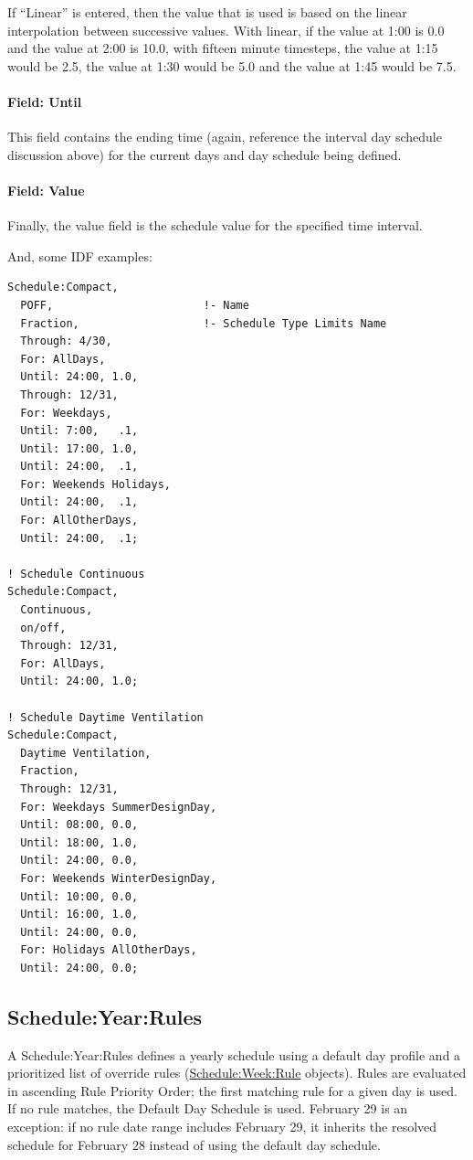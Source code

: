 If ``Linear'' is entered, then the value that is used is based on the linear interpolation between successive values. With linear, if the value at 1:00 is 0.0 and the value at 2:00 is 10.0, with fifteen minute timesteps, the value at 1:15 would be 2.5, the value at 1:30 would be 5.0 and the value at 1:45 would be 7.5.

\paragraph{Field: Until}\label{field-until}

This field contains the ending time (again, reference the interval day schedule discussion above) for the current days and day schedule being defined.

\paragraph{Field: Value}\label{field-value-1}

Finally, the value field is the schedule value for the specified time interval.

And, some IDF examples:

\begin{lstlisting}
Schedule:Compact,
  POFF,                       !- Name
  Fraction,                   !- Schedule Type Limits Name
  Through: 4/30,
  For: AllDays,
  Until: 24:00, 1.0,
  Through: 12/31,
  For: Weekdays,
  Until: 7:00,   .1,
  Until: 17:00, 1.0,
  Until: 24:00,  .1,
  For: Weekends Holidays,
  Until: 24:00,  .1,
  For: AllOtherDays,
  Until: 24:00,  .1;

! Schedule Continuous
Schedule:Compact,
  Continuous,
  on/off,
  Through: 12/31,
  For: AllDays,
  Until: 24:00, 1.0;

! Schedule Daytime Ventilation
Schedule:Compact,
  Daytime Ventilation,
  Fraction,
  Through: 12/31,
  For: Weekdays SummerDesignDay,
  Until: 08:00, 0.0,
  Until: 18:00, 1.0,
  Until: 24:00, 0.0,
  For: Weekends WinterDesignDay,
  Until: 10:00, 0.0,
  Until: 16:00, 1.0,
  Until: 24:00, 0.0,
  For: Holidays AllOtherDays,
  Until: 24:00, 0.0;
\end{lstlisting}

\subsection{Schedule:Year:Rules}\label{scheduleyearrules}

A Schedule:Year:Rules defines a yearly schedule using a default day profile and a prioritized list of override rules (\hyperref[scheduleweekrule]{Schedule:Week:Rule} objects).
Rules are evaluated in ascending Rule Priority Order; the first matching rule for a given day is used.
If no rule matches, the Default Day Schedule is used.
February 29 is an exception: if no rule date range includes February 29, it inherits the resolved schedule for February 28 instead of using the default day schedule.


